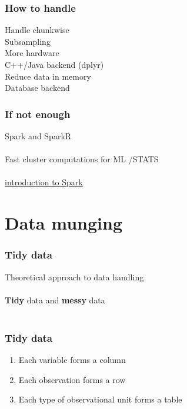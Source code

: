 \documentclass{beamer}
\begin{document}
\begin{frame}
	\frametitle{How to handle}
	\begin{center}
		Handle chunkwise\\
		Subsampling\\
		More hardware\\
		C++/Java backend (dplyr)\\
		Reduce data in memory\\
		Database backend\\
	\end{center}
\end{frame}

\begin{frame}
	\frametitle{If not enough}
	\begin{center}
		Spark and SparkR\\~\\
		Fast cluster computations  for ML /STATS\\~\\
		\href{https://www.youtube.com/watch?v=_Ss1Cm6WO-I}
		{introduction to Spark}	\\
	\end{center}
\end{frame}

\section{Data munging}

\begin{frame}
	\frametitle{Tidy data}
	\begin{center}
		Theoretical approach to data handling\\~\\
		\textbf{Tidy} data and \textbf{messy} data\\~\\
	\end{center}
\end{frame}

\begin{frame}
	\frametitle{Tidy data}
	\begin{center}
		\begin{enumerate}
			\item Each variable forms a column
			\item Each observation forms a row
			\item Each type of observational unit forms a table
		\end{enumerate}
	\end{center}
\end{frame}
\end{document}
